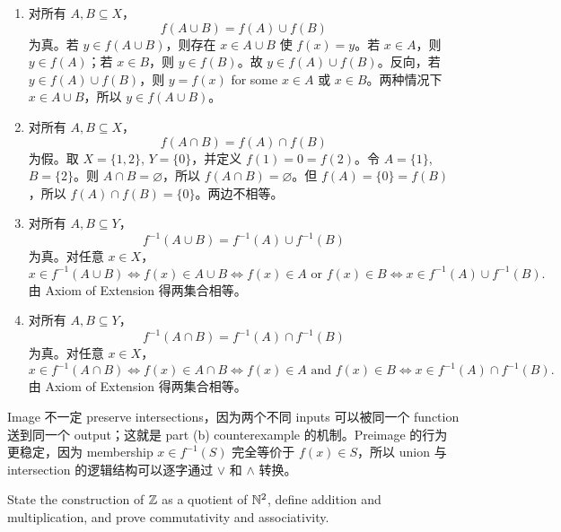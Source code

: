 \begin{solution}
\begin{enumerate}[label=(\alph*)]
  \item 对所有 \(A,B\subseteq X\)，
  \[
    f(A\cup B)=f(A)\cup f(B)
  \]
  为真。若 \(y\in f(A\cup B)\)，则存在 \(x\in A\cup B\) 使 \(f(x)=y\)。若 \(x\in A\)，则 \(y\in f(A)\)；若 \(x\in B\)，则 \(y\in f(B)\)。故 \(y\in f(A)\cup f(B)\)。反向，若 \(y\in f(A)\cup f(B)\)，则 \(y=f(x)\) for some \(x\in A\) 或 \(x\in B\)。两种情况下 \(x\in A\cup B\)，所以 \(y\in f(A\cup B)\)。
  \item 对所有 \(A,B\subseteq X\)，
  \[
    f(A\cap B)=f(A)\cap f(B)
  \]
  为假。取 \(X=\{1,2\}\), \(Y=\{0\}\)，并定义 \(f(1)=0=f(2)\)。令 \(A=\{1\}\), \(B=\{2\}\)。则 \(A\cap B=\varnothing\)，所以 \(f(A\cap B)=\varnothing\)。但 \(f(A)=\{0\}=f(B)\)，所以 \(f(A)\cap f(B)=\{0\}\)。两边不相等。
  \item 对所有 \(A,B\subseteq Y\)，
  \[
    f^{-1}(A\cup B)=f^{-1}(A)\cup f^{-1}(B)
  \]
  为真。对任意 \(x\in X\)，
  \[
  x\in f^{-1}(A\cup B)
  \Longleftrightarrow f(x)\in A\cup B
  \Longleftrightarrow f(x)\in A\text{ or }f(x)\in B
  \Longleftrightarrow x\in f^{-1}(A)\cup f^{-1}(B).
  \]
  由 Axiom of Extension 得两集合相等。
  \item 对所有 \(A,B\subseteq Y\)，
  \[
    f^{-1}(A\cap B)=f^{-1}(A)\cap f^{-1}(B)
  \]
  为真。对任意 \(x\in X\)，
  \[
  x\in f^{-1}(A\cap B)
  \Longleftrightarrow f(x)\in A\cap B
  \Longleftrightarrow f(x)\in A\text{ and }f(x)\in B
  \Longleftrightarrow x\in f^{-1}(A)\cap f^{-1}(B).
  \]
  由 Axiom of Extension 得两集合相等。
\end{enumerate}
\end{solution}

\begin{explanation}
Image 不一定 preserve intersections，因为两个不同 inputs 可以被同一个 function 送到同一个 output；这就是 part (b) counterexample 的机制。Preimage 的行为更稳定，因为 membership \(x\in f^{-1}(S)\) 完全等价于 \(f(x)\in S\)，所以 union 与 intersection 的逻辑结构可以逐字通过 \(\lor\) 和 \(\land\) 转换。
\end{explanation}

\begin{exerciseblock}
State the construction of \(\mathbb{Z}\) as a quotient of \(\mathbb{N}^2\), define addition and multiplication, and prove commutativity and associativity.
\end{exerciseblock}


